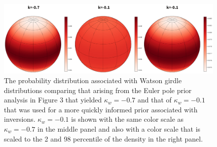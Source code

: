 \documentclass[11pt,letterpaper]{article}
\begin{document}
\begin{figure}[h!]
\noindent\includegraphics[width=\textwidth]{SI_fig_Euler_prior.pdf}
\caption{The probability distribution associated with Watson girdle distributions comparing that arising from the Euler pole prior analysis in Figure 3 that yielded $\kappa_w=-0.7$ and that of $\kappa_w=-0.1$ that was used for a more quickly informed prior associated with inversions.  $\kappa_w=-0.1$ is shown with the same color scale as $\kappa_w=-0.7$ in the middle panel and also with a color scale that is scaled to the 2 and 98 percentile of the density in the right panel.}
\label{pdffiguresample}
\end{figure}
\end{document}

